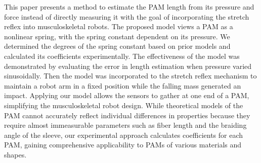 This paper presents a method to estimate the PAM length from its pressure and force instead of directly measuring it with the goal of incorporating the stretch reflex into musculoskeletal robots.
The proposed model views a PAM as a nonlinear spring, with the spring constant dependent on its pressure. 
We determined the degrees of the spring constant based on prior models and calculated its coefficients experimentally.
The effectiveness of the model was demonstrated by evaluating the error in length estimation when pressure varied sinusoidally.
Then the model was incorporated to the stretch reflex mechanism to maintain a robot arm in a fixed position while the falling mass generated an impact.
Applying our model allows the sensors to gather at one end of a PAM, simplifying the musculoskeletal robot design. 
While theoretical models of the PAM cannot accurately reflect individual differences in properties because they require almost immeasurable parameters such as fiber length and the braiding angle of the sleeve\cite{motion}, 
our experimental approach calculates coefficients for each PAM, gaining comprehensive applicability to PAMs of various materials and shapes.

